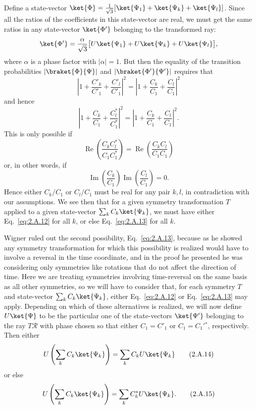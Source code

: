 Define a state-vector
$\ket{\Phi}=\frac{1}{\sqrt{3}}[\ket{\Psi_1}+\ket{\Psi_k}+\ket{\Psi_l}]$.
Since all the ratios of the coefficients in this state-vector are real, we
must get the same ratios in any state-vector $\ket{\Phi'}$ belonging to the
transformed ray:
\begin{equation*}
  \ket{\Phi'}=\frac{\alpha}{\sqrt{3}}
    \bigl[U\ket{\Psi_1}+U\ket{\Psi_k}+U\ket{\Psi_l}\bigr],
\end{equation*}
where $\alpha$ is a phase factor with $|\alpha|=1$. But then the equality
of the transition probabilities $|\braket{\Phi}{\Psi}|$ and
$|\braket{\Phi'}{\Psi'}|$ requires that
\begin{equation*}
  \left|1+\frac{C'_k}{C'_1}+\frac{C'_l}{C'_1}\right|^2
    =\left|1+\frac{C_k}{C_1}+\frac{C_l}{C_1}\right|^2
\end{equation*}
and hence
\begin{equation*}
  \left|1+\frac{C_k}{C_1}+\frac{C_l^*}{C_1^*}\right|^2
    =\left|1+\frac{C_k}{C_1}+\frac{C_l}{C_1}\right|^2.
\end{equation*}
This is only possible if
\begin{equation*}
  \operatorname{Re}\left(\frac{C_k C_l^*}{C_1 C_1^*}\right)
    =\operatorname{Re}\left(\frac{C_k C_l}{C_1 C_1}\right)
\end{equation*}
or, in other words, if
\begin{equation*}
  \operatorname{Im}\left(\frac{C_k}{C_1}\right)
  \operatorname{Im}\left(\frac{C_l}{C_1}\right)=0.
\end{equation*}
Hence either $C_k/C_1$ or $C_l/C_1$ must be real for any pair $k,l$, in
contradiction with our assumptions. We see then that for a given symmetry
transformation $T$ applied to a given state-vector
$\sum_k C_k\ket{\Psi_k}$, we must have either Eq.~\eqref{eq:2.A.12} for all $k$, or
else Eq.~\eqref{eq:2.A.13} for all $k$.

Wigner ruled out the second possibility, Eq.~\eqref{eq:2.A.13}, because as he
showed any symmetry transformation for which this possibility is realized
would have to involve a reversal in the time coordinate, and in the proof
he presented he was considering only symmetries like rotations that do not
affect the direction of time. Here we are treating symmetries involving
time-reversal on the same basis as all other symmetries, so we will have to
consider that, for each symmetry $T$ and state-vector
$\sum_k C_k\ket{\Psi_k}$, either Eq.~\eqref{eq:2.A.12} or Eq.~\eqref{eq:2.A.13} may apply.
Depending on which of these alternatives is realized, we will now define
$U\ket{\Psi}$ to be the particular one of the state-vectors $\ket{\Psi'}$
belonging to the ray $T\mathcal{R}$ with phase chosen so that either
$C_1=C'_1$ or $C_1=C_1'{}^*$, respectively. Then either
\begin{equation}
  U\left(\sum_k C_k\ket{\Psi_k}\right)
    =\sum_k C_k U\ket{\Psi_k}
  \tag{2.A.14}\label{eq:2.A.14}
\end{equation}
or else
\begin{equation}
  U\left(\sum_k C_k\ket{\Psi_k}\right)
    =\sum_k C_k^* U\ket{\Psi_k}.
  \tag{2.A.15}\label{eq:2.A.15}
\end{equation}

